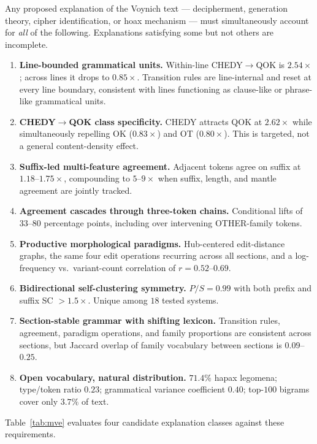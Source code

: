 \documentclass[11pt]{article}
\begin{document}
Any proposed explanation of the Voynich text --- decipherment, generation
theory, cipher identification, or hoax mechanism --- must simultaneously
account for \emph{all} of the following. Explanations satisfying some but
not others are incomplete.

\begin{enumerate}
  \item \textbf{Line-bounded grammatical units.} Within-line
        CHEDY$\to$QOK is $2.54\times$; across lines it drops to $0.85\times$.
        Transition rules are line-internal and reset at every line boundary,
        consistent with lines functioning as clause-like or phrase-like
        grammatical units.
  \item \textbf{CHEDY$\to$QOK class specificity.} CHEDY attracts QOK at
        $2.62\times$ while simultaneously repelling OK ($0.83\times$) and
        OT ($0.80\times$). This is targeted, not a general content-density
        effect.
  \item \textbf{Suffix-led multi-feature agreement.} Adjacent tokens agree
        on suffix at $1.18$--$1.75\times$, compounding to $5$--$9\times$
        when suffix, length, and mantle agreement are jointly tracked.
  \item \textbf{Agreement cascades through three-token chains.}
        Conditional lifts of $33$--$80$ percentage points, including over
        intervening OTHER-family tokens.
  \item \textbf{Productive morphological paradigms.} Hub-centered edit-distance
        graphs, the same four edit operations recurring across all sections,
        and a log-frequency vs.~variant-count correlation of $r = 0.52$--$0.69$.
  \item \textbf{Bidirectional self-clustering symmetry.} $P/S = 0.99$ with
        both prefix and suffix SC $> 1.5\times$. Unique among $18$ tested
        systems.
  \item \textbf{Section-stable grammar with shifting lexicon.} Transition
        rules, agreement, paradigm operations, and family proportions are
        consistent across sections, but Jaccard overlap of family vocabulary
        between sections is $0.09$--$0.25$.
  \item \textbf{Open vocabulary, natural distribution.} $71.4\%$ hapax
        legomena; type/token ratio $0.23$; grammatical variance coefficient
        $0.40$; top-$100$ bigrams cover only $3.7\%$ of text.
\end{enumerate}

Table~\ref{tab:mve} evaluates four candidate explanation classes against
these requirements.
\end{document}
